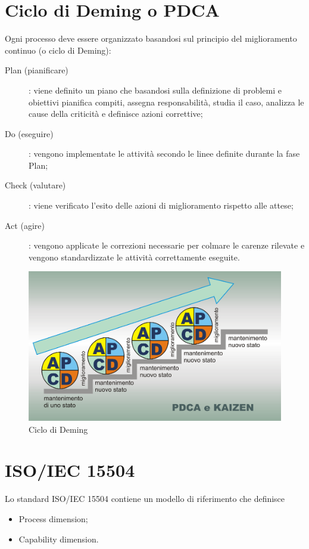 \documentclass[PianoDiQualifica.tex]{subfiles}
\begin{document}
\begin{appendices}

\chapter{Ciclo di Deming o PDCA}
Ogni processo deve essere organizzato basandosi sul principio del miglioramento continuo (o ciclo di Deming):
\begin{description}
	\item [Plan (pianificare)]: viene definito un piano che basandosi sulla definizione di problemi e obiettivi pianifica compiti, assegna responsabilità, studia il caso, analizza le cause della criticità e definisce azioni correttive; 
	\item [Do (eseguire)]: vengono implementate le attività secondo le linee definite durante la fase Plan;
	\item [Check (valutare)]: viene verificato l'esito delle azioni di miglioramento rispetto alle attese;
	\item [Act (agire)]: vengono applicate le correzioni necessarie per colmare le carenze rilevate e vengono standardizzate le attività correttamente eseguite.
\end{description}

\begin{figure}[htbp]
	\begin{center}
		\includegraphics[width=0.7\linewidth]{PDCAkaizen}
		\caption[Ciclo di Deming]{Ciclo di Deming}
		\label{fig:pdca}
	\end{center}
\end{figure}

\chapter{ISO/IEC 15504}
Lo standard ISO/IEC 15504 contiene un modello di riferimento che definisce 
\begin{itemize}
	\item Process dimension;
	\item Capability dimension.
\end{itemize}


\end{appendices}
\end{document}
